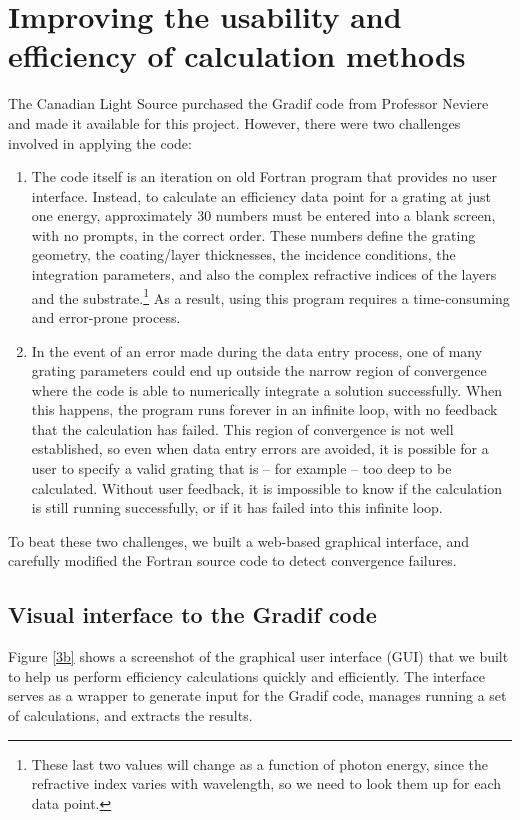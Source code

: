 \section{Improving the usability and efficiency of calculation methods}
The Canadian Light Source purchased the Gradif code from Professor Neviere and made it available for this project.  However, there were two challenges involved in applying the code:
\begin{enumerate}
\item The code itself is an iteration on old Fortran program that provides no user interface.  Instead, to calculate an efficiency data point for a grating at just one energy, approximately 30 numbers must be entered into a blank screen, with no prompts, in the correct order.  These numbers define the grating geometry, the coating/layer thicknesses, the incidence conditions, the integration parameters, and also the complex refractive indices of the layers and the substrate.\footnote{These last two values will change as a function of photon energy, since the refractive index varies with wavelength, so we need to look them up for each data point.}  As a result, using this program requires a time-consuming and error-prone process.
\item In the event of an error made during the data entry process, one of many grating parameters could end up outside the narrow region of convergence where the code is able to  numerically integrate a solution successfully.  When this happens, the program runs forever in an infinite loop, with no feedback that the calculation has failed.  This region of convergence is not well established, so even when data entry errors are avoided, it is possible for a user to specify a valid grating that is -- for example -- too deep to be calculated.  Without user feedback, it is impossible to know if the calculation is still running successfully, or if it has failed into this infinite loop.
\end{enumerate}
To beat these two challenges, we built a web-based graphical interface, and carefully modified the Fortran source code to detect convergence failures.
\subsection{Visual interface to the Gradif code}
Figure \ref{3b} shows a screenshot of the graphical user interface (GUI) that we built to help us perform efficiency calculations quickly and efficiently.  The interface serves as a wrapper to generate input for the Gradif code, manages running a set of calculations, and extracts the results.

